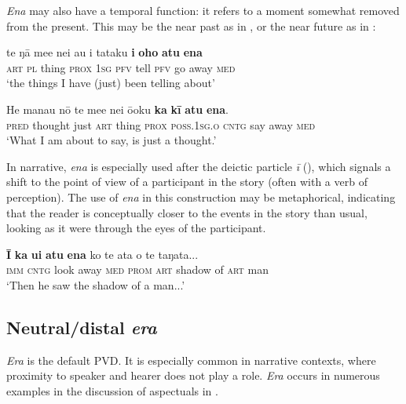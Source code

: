 \textit{Ena} may also have a temporal function: it refers to a moment somewhat removed from the present. This may be the near past as in , or the near future as in :

\ea\label{ex:7.163}
\gll te ŋā me{\ꞌ}e nei au i tataku \textbf{i} \textbf{oho} \textbf{atu} \textbf{ena} \\
\textsc{art} \textsc{pl} thing \textsc{prox} \textsc{1sg} \textsc{pfv} tell \textsc{pfv} go away \textsc{med} \\

\glt 
‘the things I have (just) been telling about’ \textstyleExampleref{[R360.037]} 
\z

\ea\label{ex:7.164}
\gll He mana{\ꞌ}u nō te me{\ꞌ}e nei ō{\ꞌ}oku \textbf{ka} \textbf{kī} \textbf{atu} \textbf{ena}. \\
\textsc{pred} thought just \textsc{art} thing \textsc{prox} \textsc{poss.1sg.o} \textsc{cntg} say away \textsc{med} \\

\glt 
‘What I am about to say, is just a thought.’ \textstyleExampleref{[R361.015]} 
\z

In narrative, \textit{ena} is especially used after the deictic particle \textit{{\ꞌ}ī} (), which signals a shift to the point of view of a participant in the story (often with a verb of perception). The use of \textit{ena} in this construction may be metaphorical, indicating that the reader is conceptually closer to the events in the story than usual, looking as it were through the eyes of the participant.

\ea\label{ex:7.165}
\gll \textbf{{\ꞌ}}\textbf{Ī} \textbf{ka} \textbf{u{\ꞌ}i} \textbf{atu} \textbf{ena} ko te {\ꞌ}ata o te taŋata... \\
\textsc{imm} \textsc{cntg} look away \textsc{med} \textsc{prom} \textsc{art} shadow of \textsc{art} man \\

\glt 
‘Then he saw the shadow of a man...’\textstyleExampleref{ [R304.095]}\textstyleExampleref{} 
\z
{}
\subsection{Neutral/distal \textit{era}~}\label{sec:7.6.4}
\textit{Era} is the default PVD. It is especially common in narrative contexts, where proximity to speaker and hearer does not play a role. \textit{Era} occurs in numerous examples in the discussion of aspectuals in . 

